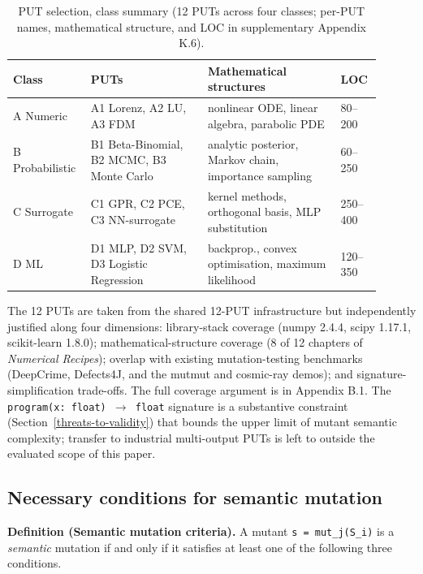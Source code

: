 \documentclass[manuscript,screen,review]{acmart}
\begin{document}
\begin{table}[t]
\caption{PUT selection, class summary (12 PUTs across four classes; per-PUT
names, mathematical structure, and LOC in supplementary Appendix
K.6).}\label{tab:p2-02}
\centering
\small
\begin{tabular}{p{0.16\linewidth}p{0.30\linewidth}p{0.34\linewidth}p{0.10\linewidth}}
\toprule
Class & PUTs & Mathematical structures & LOC \\
\midrule
A Numeric & A1 Lorenz, A2 LU, A3 FDM & nonlinear ODE, linear algebra, parabolic PDE & 80--200 \\
B Probabilistic & B1 Beta-Binomial, B2 MCMC, B3 Monte Carlo & analytic posterior, Markov chain, importance sampling & 60--250 \\
C Surrogate & C1 GPR, C2 PCE, C3 NN-surrogate & kernel methods, orthogonal basis, MLP substitution & 250--400 \\
D ML & D1 MLP, D2 SVM, D3 Logistic Regression & backprop., convex optimisation, maximum likelihood & 120--350 \\
\bottomrule
\end{tabular}
\end{table}

The 12 PUTs are taken from the shared 12-PUT infrastructure \citep{li2026minmrcomplete} but
independently justified along four dimensions: library-stack coverage
(numpy 2.4.4, scipy 1.17.1, scikit-learn 1.8.0); mathematical-structure
coverage (8 of 12 chapters of \emph{Numerical Recipes}); overlap with
existing mutation-testing benchmarks (DeepCrime, Defects4J, and the
mutmut and cosmic-ray demos); and signature-simplification trade-offs.
The full coverage argument is in Appendix B.1. The
\texttt{program(x:\ float)\ $\to$\ float} signature is a substantive
constraint (Section~\ref{threats-to-validity}) that bounds the upper limit of mutant semantic
complexity; transfer to industrial multi-output PUTs is left to
outside the evaluated scope of this paper.

\subsection{Necessary conditions for semantic mutation}\label{necessary-conditions-for-semantic-mutation-layer-1}

\textbf{Definition (Semantic mutation criteria).} A mutant
\texttt{s\textquotesingle{}\ =\ mut\_j(S\_i)} is a \emph{semantic}
mutation if and only if it satisfies at least one of the following three
conditions.
\end{document}
